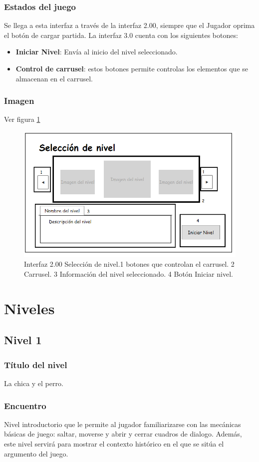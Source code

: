 \documentclass[11pt,letterpaper]{article}
\begin{document}
	\subsubsection{Estados del juego}
Se llega a esta interfaz a través de la interfaz 2.00, siempre que el Jugador oprima el botón de cargar partida.
La interfaz 3.0 cuenta con los siguientes botones:
\begin{itemize}
	\item \textbf{Iniciar Nivel}: Envía al inicio del nivel seleccionado.
	\item \textbf{Control de carrusel}: estos botones permite controlas los elementos que se almacenan en el carrusel.
\end{itemize} 
	\subsubsection{Imagen}
	Ver figura \ref{fig:SelNivel}
\begin{figure}
  \centering
   \includegraphics[width=0.6 \textwidth]{Imagenes/interfaz02_01}
  \caption{Interfaz 2.00 Selección de nivel.1 botones que controlan el carrusel. 2 Carrusel. 3 Información del nivel seleccionado. 4 Botón Iniciar nivel.}
  \label{fig:SelNivel}
\end{figure} 
 
	\section{Niveles}

\subsection{Nivel 1}
	\subsubsection{Título del nivel}
	La chica y el perro.
	\subsubsection{Encuentro}
Nivel introductorio que le permite al jugador familiarizarse con las mecánicas básicas de juego: saltar, moverse y abrir y cerrar cuadros de dialogo. Además, este nivel servirá para mostrar el contexto histórico en el que se sitúa el argumento del juego.
\end{document}
